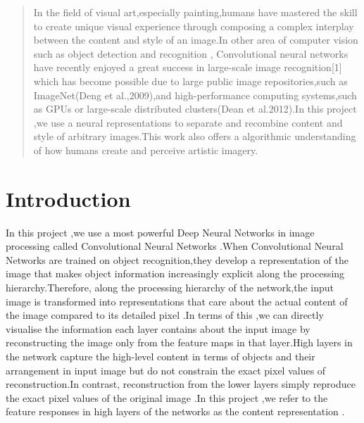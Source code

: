 \documentclass[conference]{IEEEtran}
\begin{document}
\begin{abstract}

In the field of visual art,especially painting,humans have mastered the 
skill to create unique visual experience through composing a complex interplay
between the content and style of an image.In other area of computer vision such as object detection and recognition , Convolutional neural networks 
have recently enjoyed a great success in large-scale image recognition[1] which has become possible due to large public image repositories,such as ImageNet(Deng et al.,2009),and high-performance computing systems,such as GPUs
or large-scale distributed clusters(Dean et al.2012).In this project ,we use 
a neural representations to separate and recombine content and style of arbitrary images.This work also offers a algorithmic understanding of how
humans create and perceive artistic imagery.
\end{abstract}





%
\IEEEpeerreviewmaketitle



\section{Introduction}
In this project ,we use a most powerful Deep Neural Networks in image processing called Convolutional Neural 
Networks .When Convolutional Neural Networks are trained on object recognition,they develop a representation of the image that makes object
information increasingly explicit along the processing hierarchy.Therefore,
along the processing hierarchy of the network,the input image is transformed
into representations that care about the actual content of the image compared
to its detailed pixel .In terms of this ,we can directly visualise the information each layer contains about the input image by reconstructing the image 
only from the feature maps in that layer.High layers in the network capture the high-level content in terms of objects and their arrangement in input image but do not constrain the exact pixel values of reconstruction.In contrast, reconstruction from the lower layers simply reproduce the exact
pixel values of the original image .In this project ,we refer to the feature 
responses in high layers of the networks as the content representation .
\end{document}
